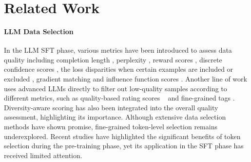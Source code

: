 \section{Related Work}\label{sec:related_work}

\paragraph{LLM Data Selection}
In the LLM SFT phase, various metrics have been introduced to assess data quality including completion length \citep{zhao2024long}, perplexity \citep{caoinstruction}, reward scores \citep{gou2024mixed}, discrete confidence scores \citep{chen2024automated}, the loss disparities when certain examples are included or excluded \citep{li2023quantity}, gradient matching \citep{zhou2023dataset}  and influence function scores \citep{xia2024less}.
Another line of work uses advanced LLMs directly to filter out low-quality samples according to different metrics, such as quality-based rating scores ~\citep{chen2023alpagasus, liu2023makes, pang2024improving} and fine-grained tags \citep{lu2023instag}. Diversity-aware scoring has also been integrated into the overall quality assessment, highlighting its importance. 
Although extensive data selection methods have shown promise, fine-grained token-level selection remains underexplored. Recent studies \citep{linnot} have highlighted the significant benefits of token selection during the pre-training phase, yet its application in the SFT phase has received limited attention.

